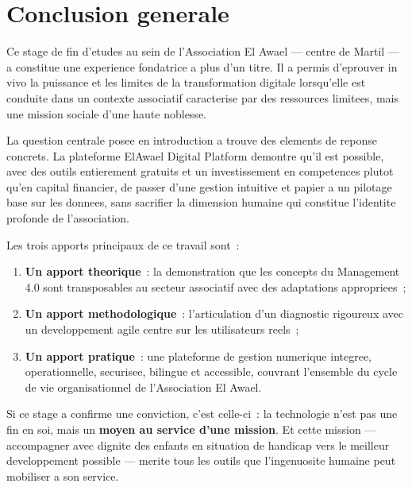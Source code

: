 \documentclass[12pt,a4paper,openany]{report}
\begin{document}
\chapter*{Conclusion generale}

Ce stage de fin d'etudes au sein de l'Association El Awael --- centre de
Martil --- a constitue une experience fondatrice a plus d'un titre. Il a
permis d'eprouver in vivo la puissance et les limites de la transformation
digitale lorsqu'elle est conduite dans un contexte associatif caracterise
par des ressources limitees, mais une mission sociale d'une haute noblesse.

\vspace{0.4cm}
La question centrale posee en introduction a trouve des elements de
reponse concrets. La plateforme ElAwael Digital Platform demontre qu'il
est possible, avec des outils entierement gratuits et un investissement en
competences plutot qu'en capital financier, de passer d'une gestion
intuitive et papier a un pilotage base sur les donnees, sans sacrifier la
dimension humaine qui constitue l'identite profonde de l'association.

\vspace{0.4cm}
Les trois apports principaux de ce travail sont~:

\begin{enumerate}
  \item \textbf{Un apport theorique}~: la demonstration que les concepts
    du Management 4.0 sont transposables au secteur associatif avec des
    adaptations appropriees~;

  \item \textbf{Un apport methodologique}~: l'articulation d'un diagnostic
    rigoureux avec un developpement agile centre sur les utilisateurs reels~;

  \item \textbf{Un apport pratique}~: une plateforme de gestion numerique
    integree, operationnelle, securisee, bilingue et accessible, couvrant
    l'ensemble du cycle de vie organisationnel de l'Association El Awael.
\end{enumerate}

\vspace{0.4cm}
Si ce stage a confirme une conviction, c'est celle-ci~: la technologie
n'est pas une fin en soi, mais un \textbf{moyen au service d'une mission}.
Et cette mission --- accompagner avec dignite des enfants en situation de
handicap vers le meilleur developpement possible --- merite tous les outils
que l'ingenuosite humaine peut mobiliser a son service.
\end{document}
